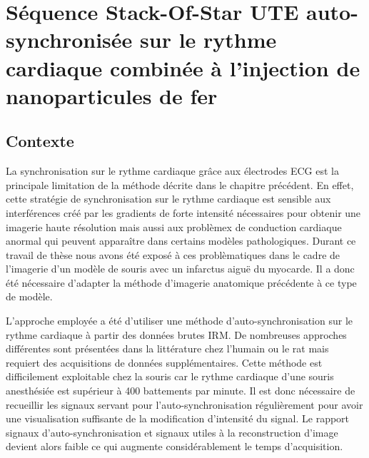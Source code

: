 \chapter{Séquence Stack-Of-Star UTE auto-synchronisée sur le rythme cardiaque combinée à l'injection de nanoparticules de fer}
\setlength{\footskip}{50pt}
\label{Chap5}
\section{Contexte}


La synchronisation sur le rythme cardiaque grâce aux électrodes ECG est la principale limitation de la méthode décrite dans le chapitre précédent. En effet, cette stratégie de synchronisation sur le rythme cardiaque est sensible aux interférences créé par les gradients de forte intensité nécessaires pour obtenir une imagerie haute résolution mais aussi aux problèmex de conduction cardiaque anormal qui peuvent apparaître dans certains modèles pathologiques. 
Durant ce travail de thèse nous avons été exposé à ces problèmatiques dans le cadre de l'imagerie d'un modèle de souris avec un infarctus aiguë du myocarde. Il a donc été nécessaire d'adapter la méthode d'imagerie anatomique précédente à ce type de modèle. 

L'approche employée a été d'utiliser une méthode d'auto-synchronisation sur le rythme cardiaque à partir des données brutes IRM. De nombreuses approches différentes sont présentées dans la littérature chez l'humain \cite{Liu:2010aa,Liu:2014ab,Ingle:2014aa,Pang:2014aa} ou le rat \cite{Kramer:2014aa} mais requiert des acquisitions de données supplémentaires. Cette méthode est difficilement exploitable chez la souris car le rythme cardiaque d'une souris anesthésiée est supérieur à 400 battements par minute. Il est donc nécessaire de recueillir les signaux servant pour l'auto-synchronisation régulièrement pour avoir une visualisation suffisante de la modification d'intensité du signal. Le rapport signaux d'auto-synchronisation et signaux utiles à la reconstruction d'image devient alors faible ce qui augmente considérablement le temps d'acquisition.

